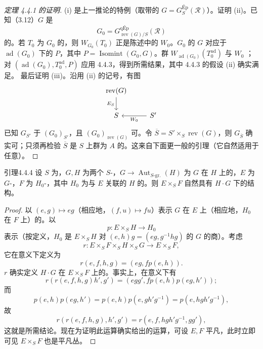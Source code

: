 \begin{proof}[定理 4.4.1 的证明]
(i) 是上一推论的特例（取带的 $G=G^{\mathrm{Ép}}_S(\mathcal R)$）。证明 (ii)。已知（3.12）$G$ 是
\[G_0=G^{\mathrm{qÉp}}_{\operatorname{rev}(G)/S}(\mathcal R)\]
的。若 $T_0$ 为 $G_0$ 的，则 $W_{G_0}(T_0)$ 正是陈述中的 $W_0$。$G_0$ 的 $G$ 对应于 $\operatorname{ad}(G_0)$ 下的 $P$，其中 $P=\operatorname{Isomint}(G_0,G)$。群 $W_{\operatorname{ad}(G_0)}(T_0^{\mathrm{ad}})$ 与 $W_0$ ；对 $(\operatorname{ad}(G_0),T_0^{\mathrm{ad}},P)$ 应用 4.4.3，得到所需结果，其中 4.4.3 的假设 (ii) 确实满足。
最后证明 (iii)。沿用 (ii) 的记号，有图
\[\begin{tikzcd}
\operatorname{rev}(G)\arrow[d,"E_S"']&\\
S&S'\arrow[l,"W_0"]
\end{tikzcd}\]
已知 $G_{S'}$ 于 $(G_0)_{S'}$，且 $(G_0)_{\operatorname{rev}(G)}$ 可。令 $\overline S=S'\times_S\operatorname{rev}(G)$，则 $G_{\overline S}$ 确实可；只须再检验 $\overline S$ 是 $S$ 上群为 $A$ 的。这来自下面更一般的引理（它自然适用于任意）。
\end{proof}
\begin{SGAresult}{引理}{4.4.4}
设 $S$ 为，$G,H$ 为两个 $S$-，$G\to\operatorname{Aut}_{S\text{-gr.}}(H)$ 为 $G$ 在 $H$ 上的，$E$ 为 $G$-，$F$ 为 $H_0$-，其中 $H_0$ 为与 $E$ 关联的 $H$ 的。则 $E\times_SF$ 自然具有 $H\cdot G$ 下的结构。
\end{SGAresult}
\begin{proof}
以 $(e,g)\mapsto eg$（相应地，$(f,u)\mapsto fu$）表示 $G$ 在 $E$ 上（相应地，$H_0$ 在 $F$ 上）的。以
\[p:E\times_SH\longrightarrow H_0\]
表示（按定义，$H_0$ 是 $E\times_SH$ 对 $(e,h)g=(eg,g^{-1}hg)$ 的 $G$ 的商）。考虑
\[r:E\times_SF\times_SH\times_SG\longrightarrow E\times_SF,\]
它在意义下定义为
\[r(e,f,h,g)=(eg,fp(e,h)).\]
 $r$ 确实定义 $H\cdot G$ 在 $E\times_SF$ 上的。事实上，在意义下有
\[r(r(e,f,h,g)h',g')=(egg',fp(e,h)p(eg,h'));\]
而
\[p(e,h)p(eg,h')=p(e,h)p(e,gh'g^{-1})=p(e,hgh'g^{-1}),\]
故
\[r(r(e,f,h,g),h',g')=r(e,f,hgh'g^{-1},gg'),\]
这就是所需结论。现在为证明此运算确实给出的运算，可设 $E,F$ 平凡，此时立即可见 $E\times_SF$ 也是平凡丛。
\end{proof}
